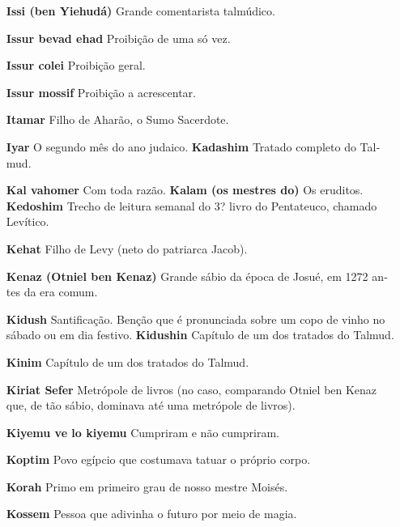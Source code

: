\begin{itemize}
\begin{enumrate}
\begin{itemize}
\begin{itemize}
\begin{itemize}
\begin{itemize}
\begin{itemize}
\item[\textbf{Issi (ben Yiehudá)}] Grande comen­tarista talmúdico.

\item[\textbf{Issur bevad ehad}] Proibição de uma só vez.

\item[\textbf{Issur colei}] Proibição geral.

\item[\textbf{Issur mossif}] Proibição a acrescen­tar.

\item[\textbf{Itamar}] Filho de Aharão, o Sumo Sa­cerdote.

\item[\textbf{Iyar} O segundo mês do ano judaico. \textbf{Kadashim}]
Tratado completo do Tal­mud.

\item[\textbf{Kal vahomer} Com toda razão. \textbf{Kalam (os mestres do)}]
Os eruditos. \textbf{Kedoshim} Trecho de leitura sema­nal do 3? livro
do Pentateuco, chama­do Levítico.

\item[\textbf{Kehat}] Filho de Levy (neto do patriar­ca Jacob).

\item[\textbf{Kenaz (Otniel ben Kenaz)}] Grande sábio da época de Josué, em
1272 an­tes da era comum.

\item[\textbf{Kidush}] Santificação. Benção que é pronunciada sobre um copo
de vinho no sábado ou em dia festivo. \textbf{Kidushin} Capítulo de um
dos trata­dos do Talmud.

\item[\textbf{Kinim}] Capítulo de um dos tratados do Talmud.

\item[\textbf{Kiriat Sefer}] Metrópole de livros (no caso, comparando Otniel
ben Kenaz que, de tão sábio, dominava até uma metrópole de livros).

\item[\textbf{Kiyemu ve lo kiyemu}] Cumpriram e não cumpriram.

\item[\textbf{Koptim}] Povo egípcio que costuma­va tatuar o próprio corpo.

\item[\textbf{Korah}] Primo em primeiro grau de nosso mestre Moisés.

\item[\textbf{Kossem}] Pessoa que adivinha o futu­ro por meio de magia.


\end{itemize}
\end{itemize}
\end{itemize}
\end{itemize}
\end{itemize}
\end{enumrate}
\end{itemize}
